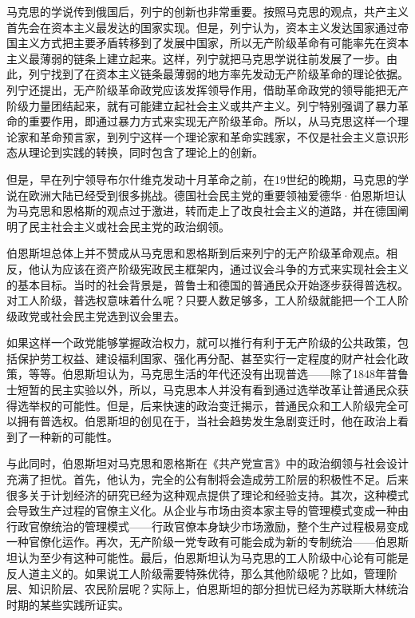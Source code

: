 马克思的学说传到俄国后，列宁的创新也非常重要。按照马克思的观点，共产主义首先会在资本主义最发达的国家实现。但是，列宁认为，资本主义发达国家通过帝国主义方式把主要矛盾转移到了发展中国家，所以无产阶级革命有可能率先在资本主义最薄弱的链条上建立起来。这样，列宁就把马克思学说往前发展了一步。由此，列宁找到了在资本主义链条最薄弱的地方率先发动无产阶级革命的理论依据。列宁还提出，无产阶级革命政党应该发挥领导作用，借助革命政党的领导能把无产阶级力量团结起来，就有可能建立起社会主义或共产主义。列宁特别强调了暴力革命的重要作用，即通过暴力方式来实现无产阶级革命。所以，从马克思这样一个理论家和革命预言家，到列宁这样一个理论家和革命实践家，不仅是社会主义意识形态从理论到实践的转换，同时包含了理论上的创新。

但是，早在列宁领导布尔什维克发动十月革命之前，在19世纪的晚期，马克思的学说在欧洲大陆已经受到很多挑战。德国社会民主党的重要领袖爱德华·伯恩斯坦认为马克思和恩格斯的观点过于激进，转而走上了改良社会主义的道路，并在德国阐明了民主社会主义或社会民主党的政治纲领。

伯恩斯坦总体上并不赞成从马克思和恩格斯到后来列宁的无产阶级革命观点。相反，他认为应该在资产阶级宪政民主框架内，通过议会斗争的方式来实现社会主义的基本目标。当时的社会背景是，普鲁士和德国的普通民众开始逐步获得普选权。对工人阶级，普选权意味着什么呢？只要人数足够多，工人阶级就能把一个工人阶级政党或社会民主党选到议会里去。

如果这样一个政党能够掌握政治权力，就可以推行有利于无产阶级的公共政策，包括保护劳工权益、建设福利国家、强化再分配、甚至实行一定程度的财产社会化政策，等等。伯恩斯坦认为，马克思生活的年代还没有出现普选——除了1848年普鲁士短暂的民主实验以外，所以，马克思本人并没有看到通过选举改革让普通民众获得选举权的可能性。但是，后来快速的政治变迁揭示，普通民众和工人阶级完全可以拥有普选权。伯恩斯坦的创见在于，当社会趋势发生急剧变迁时，他在政治上看到了一种新的可能性。

与此同时，伯恩斯坦对马克思和恩格斯在《共产党宣言》中的政治纲领与社会设计充满了担忧。首先，他认为，完全的公有制将会造成劳工阶层的积极性不足。后来很多关于计划经济的研究已经为这种观点提供了理论和经验支持。其次，这种模式会导致生产过程的官僚主义化。从企业与市场由资本家主导的管理模式变成一种由行政官僚统治的管理模式——行政官僚本身缺少市场激励，整个生产过程极易变成一种官僚化运作。再次，无产阶级一党专政有可能会成为新的专制统治——伯恩斯坦认为至少有这种可能性。最后，伯恩斯坦认为马克思的工人阶级中心论有可能是反人道主义的。如果说工人阶级需要特殊优待，那么其他阶级呢？比如，管理阶层、知识阶层、农民阶层呢？实际上，伯恩斯坦的部分担忧已经为苏联斯大林统治时期的某些实践所证实。

